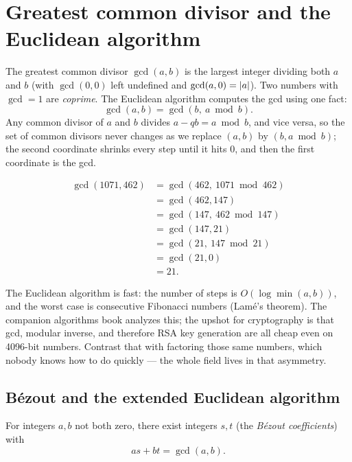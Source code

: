 \section{Greatest common divisor and the Euclidean algorithm}
\label{ch40:gcd}

The greatest common divisor $\gcd(a,b)$ is the largest integer dividing both $a$ and $b$ (with
$\gcd(0,0)$ left undefined and $\gcd(a,0)=\lvert a\rvert$). Two numbers with $\gcd = 1$ are
\emph{coprime}. The Euclidean algorithm computes the gcd using one fact:
\[
  \gcd(a,b) = \gcd(b,\ a \bmod b).
\]
Any common divisor of $a$ and $b$ divides $a - qb = a\bmod b$, and vice versa, so the set of common
divisors never changes as we replace $(a,b)$ by $(b, a\bmod b)$; the second coordinate shrinks
every step until it hits $0$, and then the first coordinate is the gcd.

\begin{example}
\label{ch40:ex-euclid}
\begin{align*}
\gcd(1071,462) &= \gcd(462,\ 1071 \bmod 462) \\
               &= \gcd(462, 147)\\
               &= \gcd(147,\ 462 \bmod 147) \\
               &= \gcd(147, 21)\\
               &= \gcd(21,\ 147 \bmod 21) \\
               &= \gcd(21, 0) \\
               &= 21.
\end{align*}
\end{example}

\begin{connectionbox}
The Euclidean algorithm is fast: the number of steps is $O(\log \min(a,b))$, and the
worst case is consecutive Fibonacci numbers (Lam\'e's theorem). The companion algorithms book
analyzes this; the upshot for cryptography is that gcd, modular inverse, and therefore RSA key
generation are all cheap even on 4096-bit numbers. Contrast that with factoring those same numbers,
which nobody knows how to do quickly --- the whole field lives in that asymmetry.
\end{connectionbox}

\subsection{B\'ezout and the extended Euclidean algorithm}
\label{ch40:bezout}

\begin{theorem}
\label{ch40:thm-bezout}
For integers $a,b$ not both zero, there exist integers $s,t$ (the \emph{B\'ezout coefficients})
with
\[
  as + bt = \gcd(a,b).
\]
\end{theorem}

